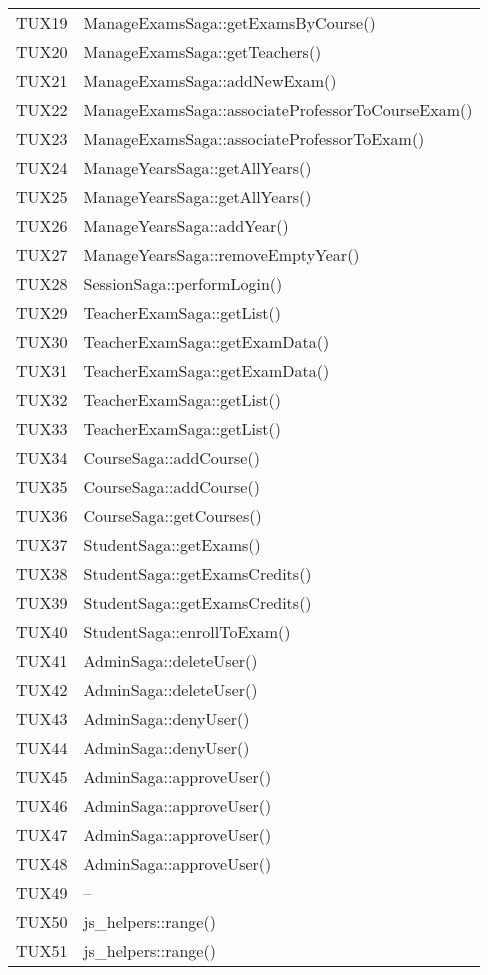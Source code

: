 \documentclass[PianoDiQualifica.tex]{subfiles}
\begin{document}
\begin{longtable}[H]{P{5cm}P{9cm}}
	TUX19 & ManageExamsSaga::getExamsByCourse() \\
	TUX20 & ManageExamsSaga::getTeachers() \\
	TUX21 & ManageExamsSaga::addNewExam() \\
	TUX22 & ManageExamsSaga::associateProfessorToCourseExam() \\
	TUX23 & ManageExamsSaga::associateProfessorToExam() \\
	TUX24 & ManageYearsSaga::getAllYears() \\
	TUX25 & ManageYearsSaga::getAllYears() \\
	TUX26 & ManageYearsSaga::addYear() \\
	TUX27 & ManageYearsSaga::removeEmptyYear() \\
	TUX28 & SessionSaga::performLogin() \\
	TUX29 & TeacherExamSaga::getList() \\
	TUX30 & TeacherExamSaga::getExamData() \\
	TUX31 & TeacherExamSaga::getExamData() \\
	TUX32 & TeacherExamSaga::getList() \\
	TUX33 & TeacherExamSaga::getList() \\
	TUX34 & CourseSaga::addCourse() \\
	TUX35 & CourseSaga::addCourse() \\
	TUX36 & CourseSaga::getCourses() \\
	TUX37 & StudentSaga::getExams() \\
	TUX38 & StudentSaga::getExamsCredits() \\
	TUX39 & StudentSaga::getExamsCredits() \\
	TUX40 & StudentSaga::enrollToExam() \\
	TUX41 & AdminSaga::deleteUser() \\
	TUX42 & AdminSaga::deleteUser() \\
	TUX43 & AdminSaga::denyUser() \\
	TUX44 & AdminSaga::denyUser() \\
	TUX45 & AdminSaga::approveUser() \\
	TUX46 & AdminSaga::approveUser() \\
	TUX47 & AdminSaga::approveUser() \\
	TUX48 & AdminSaga::approveUser() \\
	TUX49 & -- \\
	TUX50 & js\_helpers::range() \\
	TUX51 & js\_helpers::range() \\

\end{longtable}
\end{document}

